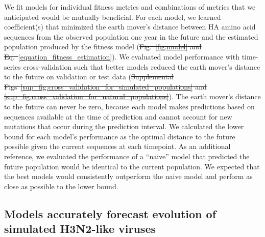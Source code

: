 \documentclass[9pt,lineno]{elife} %
\providecommand{\DIFadd}[1]{{\protect\color{blue}\uwave{#1}}} %
\providecommand{\DIFdel}[1]{{\protect\color{red}\sout{#1}}}                      %
\providecommand{\DIFaddbegin}{} %
\providecommand{\DIFaddend}{} %
\providecommand{\DIFdelbegin}{} %
\providecommand{\DIFdelend}{} %
\providecommand{\DIFaddtex}[1]{{\protect\color{blue}\uwave{#1}}} %
\providecommand{\DIFdeltex}[1]{{\protect\color{red}\sout{#1}}}                      %
\providecommand{\DIFaddbegin}{} %
\providecommand{\DIFaddend}{} %
\providecommand{\DIFdelbegin}{} %
\providecommand{\DIFdelend}{} %
\providecommand{\DIFadd}[1]{\texorpdfstring{\DIFaddtex{#1}}{#1}} %
\providecommand{\DIFdel}[1]{\texorpdfstring{\DIFdeltex{#1}}{}} %
\newcommand{\DIFscaledelfig}{0.5}
\newlength{\DIFdelgraphicswidth} %
\newlength{\DIFdelgraphicsheight} %
\newcommand{\DIFaddincludegraphics}[2][]{{\color{blue}\fbox{\DIFOincludegraphics[#1]{#2}}}} %
\newcommand{\DIFdelincludegraphics}[2][]{%
\sbox{\DIFdelgraphicsbox}{\DIFOincludegraphics[#1]{#2}}%
\settoboxwidth{\DIFdelgraphicswidth}{\DIFdelgraphicsbox} %
\settoboxtotalheight{\DIFdelgraphicsheight}{\DIFdelgraphicsbox} %
\scalebox{\DIFscaledelfig}{%
\parbox[b]{\DIFdelgraphicswidth}{\usebox{\DIFdelgraphicsbox}\\[-\baselineskip] \rule{\DIFdelgraphicswidth}{0em}}\llap{\resizebox{\DIFdelgraphicswidth}{\DIFdelgraphicsheight}{%
\setlength{\unitlength}{\DIFdelgraphicswidth}%
\begin{picture}(1,1)%
\thicklines\linethickness{2pt} %
{\color[rgb]{1,0,0}\put(0,0){\framebox(1,1){}}}%
{\color[rgb]{1,0,0}\put(0,0){\line( 1,1){1}}}%
{\color[rgb]{1,0,0}\put(0,1){\line(1,-1){1}}}%
\end{picture}%
}\hspace*{3pt}}} %
} %
\DeclareRobustCommand{\DIFaddbegin}{\DIFOaddbegin \let\includegraphics\DIFaddincludegraphics} %
\DeclareRobustCommand{\DIFaddend}{\DIFOaddend \let\includegraphics\DIFOincludegraphics} %
\DeclareRobustCommand{\DIFdelbegin}{\DIFOdelbegin \let\includegraphics\DIFdelincludegraphics} %
\DeclareRobustCommand{\DIFdelend}{\DIFOaddend \let\includegraphics\DIFOincludegraphics} %
\begin{document}
We fit models for individual fitness metrics and combinations of metrics that we anticipated would be mutually beneficial.
For each model, we learned coefficient(s) that minimized the earth mover's distance between HA amino acid sequences from the observed population one year in the future and the estimated population produced by the fitness model (\DIFdelbegin \DIFdel{Fig.~\ref{fig:model} and Eq.~}\DIFdelend \DIFaddbegin \DIFadd{Equation~}\DIFaddend \ref{equation_fitness_estimation}).
We evaluated model performance with time-series cross-validation such that better models reduced the earth mover's distance to the future on validation or test data (\DIFdelbegin \DIFdel{Supplemental Figs~\ref{sup_fig:cross_validation_for_simulated_populations} and \ref{sup_fig:cross_validation_for_natural_populations}}\DIFdelend \DIFaddbegin \DIFadd{Figures~\ref{fig:cross_validation_for_simulated_populations} and \ref{fig:cross_validation_for_natural_populations}}\DIFaddend ).
The earth mover's distance to the future can never be zero, because each model makes predictions based on sequences available at the time of prediction and cannot account for new mutations that occur during the prediction interval.
We calculated the lower bound for each model's performance as the optimal distance to the future possible given the current sequences at each timepoint.
As an additional reference, we evaluated the performance of a ``naive'' model that predicted the future population would be identical to the current population.
We expected that the best models would consistently outperform the naive model and perform as close as possible to the lower bound.

\subsection*{Models accurately forecast evolution of simulated H3N2-like viruses}
\end{document}
